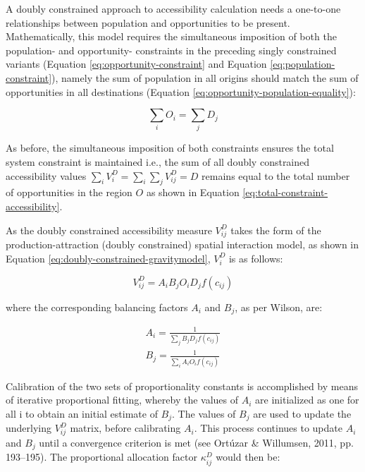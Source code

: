 \documentclass[
11pt, %
oneside, %
english, %
singlespacing, %
]{macthesis} %
\begin{document}
A doubly constrained approach to accessibility calculation needs a one-to-one relationships between population and opportunities to be present. Mathematically, this model requires the simultaneous imposition of both the population- and opportunity- constraints in the preceding singly constrained variants (Equation \ref{eq:opportunity-constraint} and Equation \ref{eq:population-constraint}), namely the sum of population in all origins should match the sum of opportunities in all destinations (Equation \ref{eq:opportunity-population-equality}):

\begin{equation}
\label{eq:opportunity-population-equality}
\sum_i O_i = \sum_j D_j
\end{equation} 

As before, the simultaneous imposition of both constraints ensures the total system constraint is maintained i.e., the sum of all doubly constrained accessibility values \(\sum_i V^D_{i} = \sum_i\sum_j  V^D_{ij} = D\) remains equal to the total number of opportunities in the region \(O\) as shown in Equation \ref{eq:total-constraint-accessibility}.

As the doubly constrained accessibility measure \(V_{ij}^D\) takes the form of the production-attraction (doubly constrained) spatial interaction model, as shown in Equation \ref{eq:doubly-constrained-gravitymodel}, \(V_{i}^D\) is as follows:

\begin{equation}
\label{eq:doubly-constrained-accessibility}
V_{ij}^D = A_i B_j O_i D_j f(c_{ij})
\end{equation} 

\noindent where the corresponding balancing factors \(A_i\) and \(B_j\), as per Wilson, are:

\[
\begin{array}{l}
A_i = \frac{1}{\sum_j B_j D_j f(c_{ij})}\\
B_j = \frac{1}{\sum_i A_i O_i f(c_{ij})}
\end{array}
\]

Calibration of the two sets of proportionality constants is accomplished by means of iterative proportional fitting, whereby the values of \(A_i\) are initialized as one for all i to obtain an initial estimate of \(B_j\). The values of \(B_j\) are used to update the underlying \(V_{ij}^D\) matrix, before calibrating \(A_i\). This process continues to update \(A_i\) and \(B_j\) until a convergence criterion is met (see Ortúzar \& Willumsen, 2011, pp. 193--195). The proportional allocation factor \(\kappa_{ij}^D\) would then be:
\end{document}

